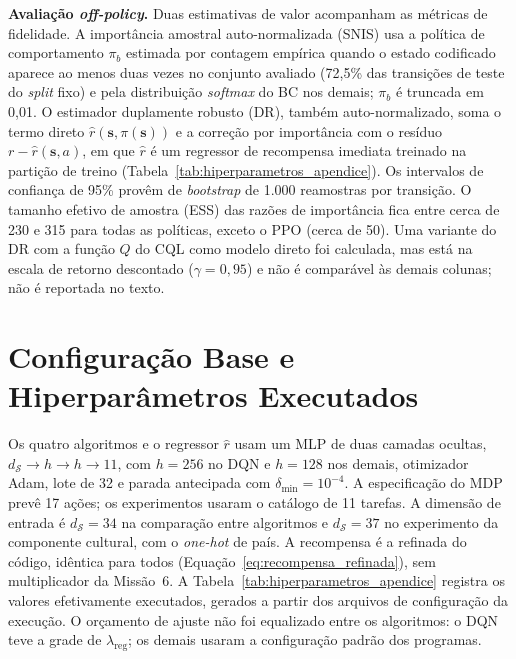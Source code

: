 \noindent\textbf{Avaliação \textit{off-policy}.} Duas estimativas de valor acompanham as métricas de fidelidade. A importância amostral auto-normalizada (SNIS) usa a política de comportamento $\pi_b$ estimada por contagem empírica quando o estado codificado aparece ao menos duas vezes no conjunto avaliado (72,5\% das transições de teste do \emph{split} fixo) e pela distribuição \emph{softmax} do BC nos demais; $\pi_b$ é truncada em 0,01. O estimador duplamente robusto (DR), também auto-normalizado, soma o termo direto $\hat{r}(\mathbf{s}, \pi(\mathbf{s}))$ e a correção por importância com o resíduo $r - \hat{r}(\mathbf{s}, a)$, em que $\hat{r}$ é um regressor de recompensa imediata treinado na partição de treino (Tabela~\ref{tab:hiperparametros_apendice}). Os intervalos de confiança de 95\% provêm de \emph{bootstrap} de 1.000 reamostras por transição. O tamanho efetivo de amostra (ESS) das razões de importância fica entre cerca de 230 e 315 para todas as políticas, exceto o PPO (cerca de 50). Uma variante do DR com a função $Q$ do CQL como modelo direto foi calculada, mas está na escala de retorno descontado ($\gamma = 0{,}95$) e não é comparável às demais colunas; não é reportada no texto.

\section*{Configuração Base e Hiperparâmetros Executados}

Os quatro algoritmos e o regressor $\hat{r}$ usam um MLP de duas camadas ocultas, $d_{\mathcal{S}} \rightarrow h \rightarrow h \rightarrow 11$, com $h = 256$ no DQN e $h = 128$ nos demais, otimizador Adam, lote de 32 e parada antecipada com $\delta_{\min} = 10^{-4}$. A especificação do MDP prevê 17 ações; os experimentos usaram o catálogo de 11 tarefas. A dimensão de entrada é $d_{\mathcal{S}} = 34$ na comparação entre algoritmos e $d_{\mathcal{S}} = 37$ no experimento da componente cultural, com o \textit{one-hot} de país. A recompensa é a refinada do código, idêntica para todos (Equação~\ref{eq:recompensa_refinada}), sem multiplicador da Missão~6. A Tabela~\ref{tab:hiperparametros_apendice} registra os valores efetivamente executados, gerados a partir dos arquivos de configuração da execução. O orçamento de ajuste não foi equalizado entre os algoritmos: o DQN teve a grade de $\lambda_{\text{reg}}$; os demais usaram a configuração padrão dos programas.

